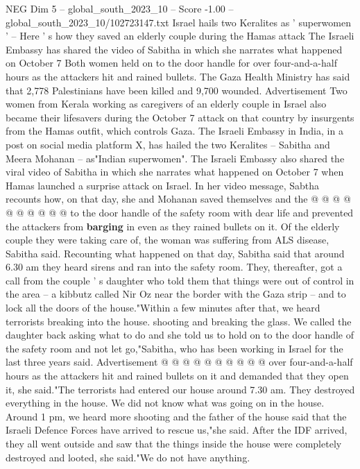\begin{textsample}{NEG Dim 5 – global\_south\_2023\_10 – Score -1.00 – global\_south\_2023\_10/102723147.txt}  \label{ex:f5_neg_066}
Israel hails two Keralites as ' superwomen ' -- Here ' s how they saved an elderly couple during the Hamas attack The Israeli Embassy has shared the video of Sabitha in which she narrates what happened on October 7 Both women held on to the door handle for over four-and-a-half hours as the attackers hit and rained bullets.
The Gaza Health Ministry has said that 2,778 Palestinians have been killed and 9,700 wounded.
Advertisement Two women from Kerala working as caregivers of an elderly couple in Israel also became their lifesavers during the October 7 attack on that country by insurgents from the Hamas outfit, which controls Gaza.
The Israeli Embassy in India, in a post on social media platform X, has hailed the two Keralites -- Sabitha and Meera Mohanan -- as"Indian superwomen".
The Israeli Embassy also shared the viral video of Sabitha in which she narrates what happened on October 7 when Hamas launched a surprise attack on Israel.
In her video message, Sabtha recounts how, on that day, she and Mohanan saved themselves and the @ @ @ @ @ @ @ @ @ @ to the door handle of the safety room with dear life and prevented the attackers from \textbf{barging} in even as they rained bullets on it.
Of the elderly couple they were taking care of, the woman was suffering from ALS disease, Sabitha said.
Recounting what happened on that day, Sabitha said that around 6.30 am they heard sirens and ran into the safety room.
They, thereafter, got a call from the couple ' s daughter who told them that things were out of control in the area -- a kibbutz called Nir Oz near the border with the Gaza strip -- and to lock all the doors of the house."Within a few minutes after that, we heard terrorists breaking into the house. shooting and breaking the glass.
We called the daughter back asking what to do and she told us to hold on to the door handle of the safety room and not let go,"Sabitha, who has been working in Israel for the last three years said.
Advertisement @ @ @ @ @ @ @ @ @ @ over four-and-a-half hours as the attackers hit and rained bullets on it and demanded that they open it, she said."The terrorists had entered our house around 7.30 am.
They destroyed everything in the house.
We did not know what was going on in the house.
Around 1 pm, we heard more shooting and the father of the house said that the Israeli Defence Forces have arrived to rescue us,"she said.
After the IDF arrived, they all went outside and saw that the things inside the house were completely destroyed and looted, she said."We do not have anything.

\end{textsample}
